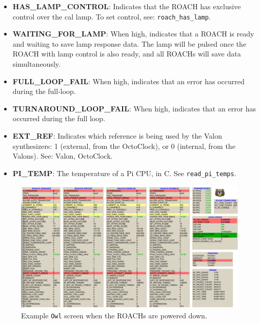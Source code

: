 \begin{itemize}[leftmargin=*,label={}]
\item \textbf{HAS\_LAMP\_CONTROL}: Indicates that the ROACH has exclusive control over the cal lamp. To set control, see: \texttt{roach\_has\_lamp}.

\item \textbf{WAITING\_FOR\_LAMP}: When high, indicates that a ROACH is ready and waiting to save lamp response data. The lamp will be pulsed once the ROACH with lamp control is also ready, and all ROACHs will save data simultaneously.

\item \textbf{FULL\_LOOP\_FAIL}: When high, indicates that an error has occurred during the full-loop.

\item \textbf{TURNAROUND\_LOOP\_FAIL}: When high, indicates that an error has occurred during the full loop.

\item \textbf{EXT\_REF}: Indicates which reference is being used by the Valon synthesizers: 1 (external, from the OctoClock), or 0 (internal, from the Valons). See: Valon, OctoClock.

\item \textbf{PI\_TEMP}: The temperature of a Pi CPU, in C. See \texttt{read\_pi\_temps}.

\end{itemize}

\begin{figure}
\includegraphics[width=\linewidth,keepaspectratio]{./figures/software/roaches_off}
\caption[~Example OWL screen when the ROACHs are powered down.]{Example \texttt{Owl} screen when the ROACHs are powered down.}
\label{fig:roaches off screen}
\end{figure}


